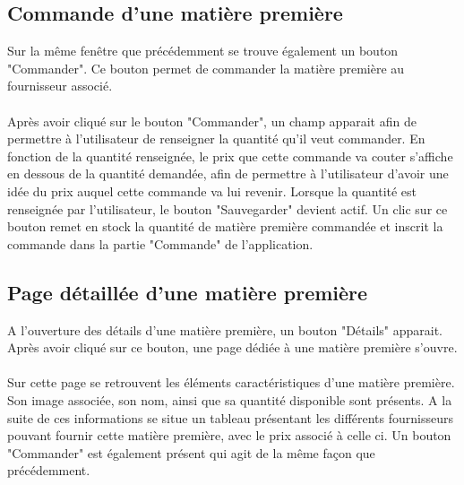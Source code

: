 \subsection{Commande d'une matière première}
Sur la même fenêtre que précédemment se trouve également un bouton "Commander". 
Ce bouton permet de commander la matière première au fournisseur associé.

\paragraph{}
Après avoir cliqué sur le bouton "Commander", un champ apparait afin de 
permettre à l'utilisateur de renseigner la quantité qu'il veut commander. 
En fonction de la quantité renseignée, le prix que cette commande va couter 
s'affiche en dessous de la quantité demandée, afin de permettre à l'utilisateur 
d'avoir une idée du prix auquel cette commande va lui revenir. Lorsque la 
quantité est renseignée par l'utilisateur, le bouton "Sauvegarder" devient 
actif. Un clic sur ce bouton remet en stock la quantité de matière première 
commandée et inscrit la commande dans la partie "Commande" de l'application.

\subsection{Page détaillée d'une matière première}
A l'ouverture des détails d'une matière première, un bouton "Détails" apparait. 
Après avoir cliqué sur ce bouton, une page dédiée à une matière première 
s'ouvre. 

\paragraph{}
Sur cette page se retrouvent les éléments caractéristiques d'une matière 
première. Son image associée, son nom, ainsi que sa quantité disponible sont 
présents. A la suite de ces informations se situe un tableau présentant les 
différents fournisseurs pouvant fournir cette matière première, avec le prix 
associé à celle ci. Un bouton "Commander" est également présent qui agit de la 
même façon que précédemment.

